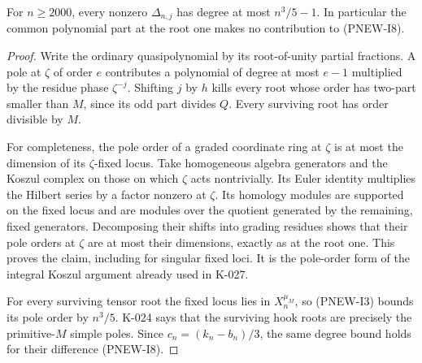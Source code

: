\begin{lemma}[PNEW-016b]
For $n\ge2000$, every nonzero $\Delta_{n,j}$ has degree at most
$n^3/5-1$. In particular the common polynomial part at the root
one makes no contribution to (PNEW-I8).
\end{lemma}
\begin{proof}
Write the ordinary quasipolynomial by its root-of-unity partial
fractions. A pole at $\zeta$ of order $e$ contributes a polynomial
of degree at most $e-1$ multiplied by the residue phase
$\zeta^{-j}$. Shifting $j$ by $h$ kills every root whose order has
two-part smaller than $M$, since its odd part divides $Q$.
Every surviving root has order divisible by $M$.

For completeness, the pole order of a graded coordinate ring at
$\zeta$ is at most the dimension of its $\zeta$-fixed locus.
Take homogeneous algebra generators and the Koszul complex on
those on which $\zeta$ acts nontrivially. Its Euler identity
multiplies the Hilbert series by a factor nonzero at $\zeta$.
Its homology modules are supported on the fixed locus and are
modules over the quotient generated by the remaining, fixed
generators. Decomposing their shifts into grading residues shows
that their pole orders at $\zeta$ are at most their dimensions,
exactly as at the root one. This proves the claim, including for
singular fixed loci. It is the pole-order form of the integral
Koszul argument already used in K-027.

For every surviving tensor root the fixed locus lies in
$X_n^{\mu_M}$, so (PNEW-I3) bounds its pole order by $n^3/5$.
K-024 says that the surviving hook roots are precisely the
primitive-$M$ simple poles. Since $c_n=(k_n-b_n)/3$, the same
degree bound holds for their difference (PNEW-I8).
\end{proof}

